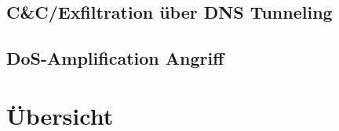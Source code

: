 
\subsection{C\&C/Exfiltration über DNS Tunneling}


\subsection{DoS-Amplification Angriff}


\section{Übersicht}
\label{sec:Attacks-Summary}
